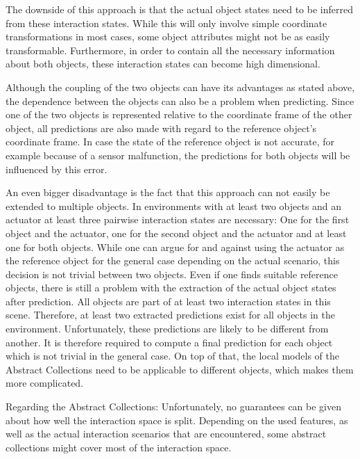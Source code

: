 The downside of this approach is that the actual object states need to be inferred from these interaction states. While this will only involve simple coordinate transformations in most cases, some object attributes might not be as easily transformable. Furthermore, in order to contain all the necessary information about both objects, these interaction states can become high dimensional. 

Although the coupling of the two objects can have its advantages as stated above, the dependence between the objects can also be a problem when predicting. Since one of the two objects is represented relative to the coordinate frame of the other object, all predictions are also made with regard to the reference object's coordinate frame. In case the state of the reference object is not accurate, for example because of a sensor malfunction, the predictions for both objects will be influenced by this error. 

An even bigger disadvantage is the fact that this approach can not easily be extended to multiple objects. In environments with at least two objects and an actuator at least three pairwise interaction states are necessary: One for the first object and the actuator, one for the second object and the actuator and at least one for both objects. While one can argue for and against using the actuator as the reference object for the general case depending on the actual scenario, this decision is not trivial between two objects. Even if one finds suitable reference objects, there is still a problem with the extraction of the actual object states after prediction. All objects are part of at least two interaction states in this scene. Therefore, at least two extracted predictions exist for all objects in the environment. Unfortunately, these predictions are likely to be different from another. It is therefore required to compute a final prediction for each object which is not trivial in the general case. On top of that, the local models of the Abstract Collections need to be applicable to different objects, which makes them more complicated.

Regarding the Abstract Collections:
Unfortunately, no guarantees can be given about how well the interaction space is split. Depending on the used features, as well as the actual interaction scenarios that are encountered, some abstract collections might cover most of the interaction space. 



